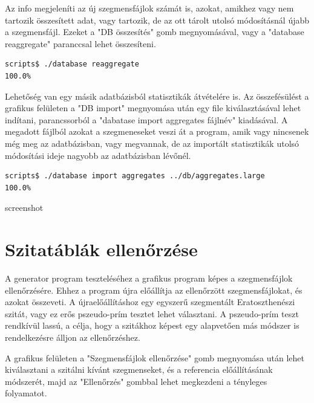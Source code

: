 \documentclass[12pt]{report}
\begin{document}
Az info megjeleníti az új szegmensfájlok számát is, azokat,
amikhez vagy nem tartozik összesített adat, vagy tartozik,
de az ott tárolt utolsó módosításnál újabb a szegmensfájl.
Ezeket a "DB összesítés" gomb megnyomásával,
vagy a "database reaggregate" paranccsal lehet összesíteni.

{\tiny
\begin{lstlisting}[language=bash]
scripts$ ./database reaggregate
100.0%
\end{lstlisting}
}

Lehetőség van egy másik adatbázisból statisztikák átvételére is.
Az összefésülést a grafikus felületen a "DB import" megnyomása után
egy file kiválasztásával lehet indítani, parancssorból a "dabatase import aggregates fájlnév"
kiadásával. A megadott fájlból azokat a szegmeneseket veszi át a program,
amik vagy nincsenek még meg az adatbázisban, vagy megvannak, de az importált
statisztikák utolsó módosítási ideje nagyobb az adatbázisban lévőnél.

{\tiny
\begin{lstlisting}[language=bash]
scripts$ ./database import aggregates ../db/aggregates.large
100.0%
\end{lstlisting}
}

{\color{red}screenshot}

\section{Szitatáblák ellenőrzése}

A generator program teszteléséhez a grafikus program képes a szegmensfájlok
ellenőrzésére.
Ehhez a program újra előállítja az ellenőrzött szegmensfájlokat,
és azokat összeveti. A újraelőállításhoz egy egyszerű szegmentált
Eratoszthenészi szitát, vagy ez erős pszeudo-prím tesztet lehet választani.
A pszeudo-prím teszt rendkívül lassú, a célja, hogy a szitákhoz képest egy
alapvetően más módszer is rendelkezésre álljon az ellenőrzéshez.

A grafikus felületen a "Szegmensfájlok ellenőrzése" gomb megnyomása után
lehet kiválasztani a szitálni kívánt szegmenseket, és a referencia előállításának
módszerét, majd az "Ellenőrzés" gombbal lehet megkezdeni a tényleges
folyamatot.
\end{document}
